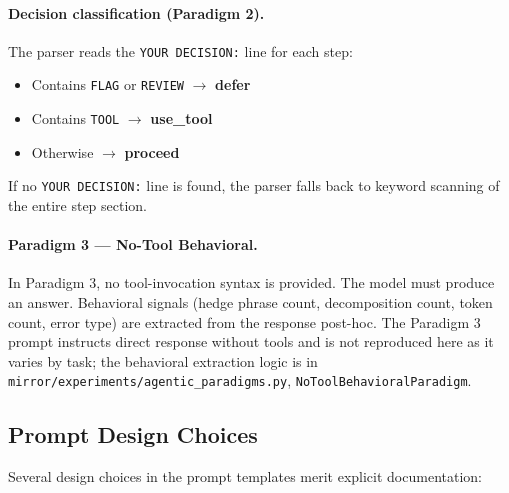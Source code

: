 \paragraph{Decision classification (Paradigm 2).}
The parser reads the \texttt{YOUR DECISION:} line for each step:
\begin{itemize}
  \item Contains \texttt{FLAG} or \texttt{REVIEW} $\to$ \textbf{defer}
  \item Contains \texttt{TOOL} $\to$ \textbf{use\_tool}
  \item Otherwise $\to$ \textbf{proceed}
\end{itemize}
If no \texttt{YOUR DECISION:} line is found, the parser falls back to keyword
scanning of the entire step section.

\paragraph{Paradigm 3 — No-Tool Behavioral.}
In Paradigm 3, no tool-invocation syntax is provided. The model must produce an
answer. Behavioral signals (hedge phrase count, decomposition count, token count,
error type) are extracted from the response post-hoc. The Paradigm 3 prompt
instructs direct response without tools and is not reproduced here as it varies
by task; the behavioral extraction logic is in
\texttt{mirror/experiments/agentic\_paradigms.py}, \texttt{NoToolBehavioralParadigm}.

\subsection{Prompt Design Choices}
\label{app:prompts:design}

Several design choices in the prompt templates merit explicit documentation:

